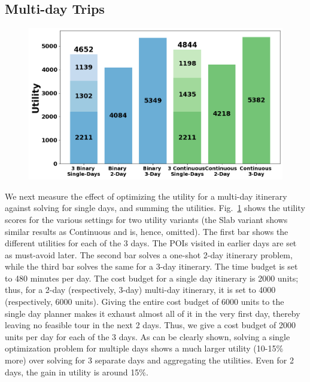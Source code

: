 \subsection{Multi-day Trips}

\begin{figure}[t]
\centering
\includegraphics[width=\figwidth]{plots/multivssingle.png}
\label{fig:multi-day}
\end{figure}

We next measure the effect of optimizing the utility for a multi-day itinerary against solving for single days, and summing the utilities.
Fig.~\ref{fig:multi-day} shows the utility scores for the various settings for two utility variants (the Slab variant shows similar results as Continuous and is, hence, omitted).
The first bar shows the different utilities for each of the 3 days. The POIs visited in earlier days are set as must-avoid later.
The second bar solves a one-shot 2-day itinerary problem, while the third bar solves the same for a 3-day itinerary.
The time budget is set to 480 minutes per day.
The cost budget for a single day itinerary is 2000 units; thus, for a 2-day (respectively, 3-day) multi-day itinerary, it is set to 4000 (respectively, 6000 units).
Giving the entire cost budget of 6000 units to the single day planner makes it exhaust almost all of it in the very first day, thereby leaving no feasible tour in the next 2 days.
Thus, we give a cost budget of 2000 units per day for each of the 3 days.
As can be clearly shown, solving a single optimization problem for multiple days shows a much larger utility (10-15\% more) over solving for 3 separate days and aggregating the utilities.
Even for 2 days, the gain in utility is around 15\%.

